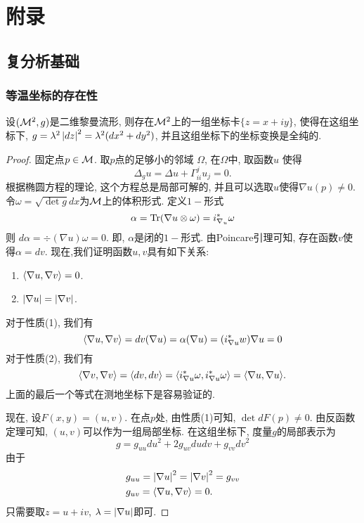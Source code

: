 \appendix
\appendix
\chapter{附录}
\section{复分析基础}
\subsection{等温坐标的存在性}
\begin{theorem}
    设$({\mathcal{M}}^2, g)$是二维黎曼流形, 则存在${\mathcal{M}}^2$上的一组坐标卡$\{z=x+iy\}$, 使得在这组坐标下, $g=\lambda^2\left | dz \right |^2=\lambda^2(dx^2+dy^2)$, 并且这组坐标下的坐标变换是全纯的.
\end{theorem}
\begin{proof}
    固定点$p \in {\mathcal{M}}$. 取$p$点的足够小的邻域 $\Omega$, 在$\Omega$中, 取函数$u$ 使得
    \begin{equation}
        \Delta_g u= \Delta u + \Gamma^j_{ii}u_j=0.
    \end{equation}
    根据椭圆方程的理论, 这个方程总是局部可解的, 并且可以选取$u$使得$\nabla u(p) \ne 0$. 令$\omega= \sqrt{\det g}dx$为${\mathcal{M}}$上的体积形式. 定义$1-$形式
    \begin{equation}
        \alpha= \text{Tr}(\nabla u \otimes \omega)= i^*_{\nabla_u } \omega
    \end{equation}
    则 $d\alpha= \div(\nabla u)\omega =0$. 即, $\alpha$是闭的$1-$形式. 由Poincare引理可知, 存在函数$v$使得$\alpha= dv$.  现在,我们证明函数$u,v$具有如下关系:
    \begin{enumerate}
        \item ${\left < \nabla u, \nabla v \right >} =0$.
        \item $\left | \nabla u \right |= \left | \nabla v \right |$.
    \end{enumerate}
    对于性质(1), 我们有
    \begin{equation}
        {\left < \nabla u, \nabla v \right >} = dv(\nabla u) = \alpha(\nabla u)= (i^*_{\nabla u} w)\nabla u =0
    \end{equation}
    对于性质(2), 我们有
    \begin{equation}
        {\left < \nabla v, \nabla v \right >} = {\left < dv, dv \right >} = {\left < i^*_{\nabla u}\omega ,  i^*_{\nabla u}\omega \right >}= {\left < \nabla u, \nabla u \right >}.
    \end{equation}
    上面的最后一个等式在测地坐标下是容易验证的. 
    \par 现在, 设$F(x,y)=(u,v)$. 在点$p$处, 由性质(1)可知, $\det dF(p) \ne 0$. 由反函数定理可知, $(u,v)$可以作为一组局部坐标. 在这组坐标下, 度量$g$的局部表示为
    \begin{equation}
        g=g_{uu}du^2+2g_{uv}dudv+g_{vv}dv^2
    \end{equation}
    由于
    \begin{align}
        &g_{uu}= \left | \nabla u \right |^2 = \left | \nabla v \right |^2= g_{vv} \\
        &g_{uv}={\left < \nabla u, \nabla v \right >}=0. 
    \end{align}
    只需要取$z=u+iv$, $\lambda= \left | \nabla u \right |$即可.
\end{proof}

